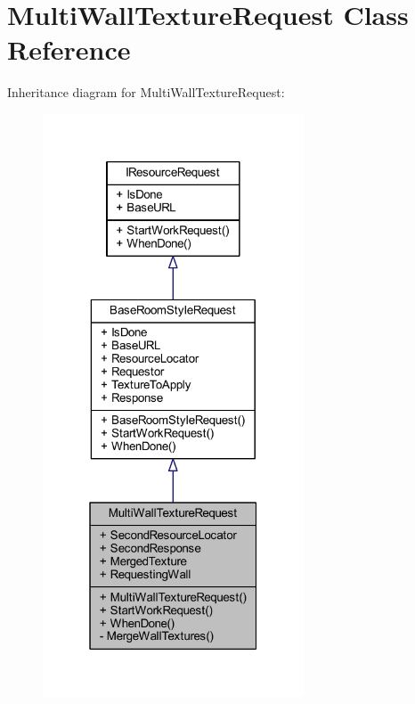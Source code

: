 \hypertarget{class_multi_wall_texture_request}{}\section{Multi\+Wall\+Texture\+Request Class Reference}
\label{class_multi_wall_texture_request}


Inheritance diagram for Multi\+Wall\+Texture\+Request\+:
\nopagebreak
\begin{figure}[H]
\begin{center}
\leavevmode
\includegraphics[width=220pt]{class_multi_wall_texture_request__inherit__graph}
\end{center}
\end{figure}


